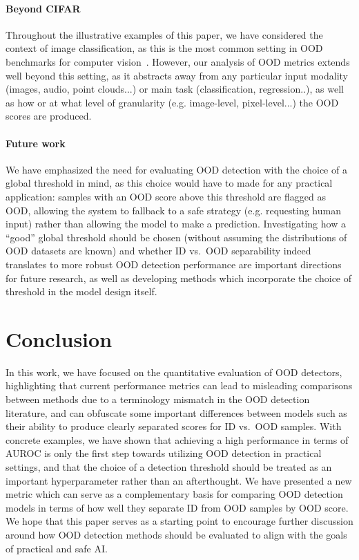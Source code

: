 \documentclass[10pt,twocolumn,letterpaper]{article}
\begin{document}
\paragraph{Beyond CIFAR} Throughout the illustrative examples of this paper, we have considered the context of image classification, as this is the most common setting in OOD benchmarks for computer vision~\cite{openood-benchmark-2022}. However, our analysis of OOD metrics extends well beyond this setting, as it abstracts away from any particular input modality (images, audio, point clouds...) or main task (classification, regression..), as well as how or at what level of granularity (e.g. image-level, pixel-level...) the OOD scores are produced.

\paragraph{Future work} We have emphasized the need for evaluating OOD detection with the choice of a global threshold in mind, as this choice would have to made for any practical application: samples with an OOD score above this threshold are flagged as OOD, allowing the system to fallback to a safe strategy (e.g. requesting human input) rather than allowing the model to make a prediction. Investigating how a ``good'' global threshold should be chosen (without assuming the distributions of OOD datasets are known) and whether ID vs.~OOD separability indeed translates to more robust OOD detection performance are important directions for future research, as well as developing methods which incorporate the choice of threshold in the model design itself.


\section{Conclusion}

In this work, we have focused on the quantitative evaluation of OOD detectors, highlighting that current performance metrics can lead to misleading comparisons between methods due to a terminology mismatch in the OOD detection literature, and can obfuscate some important differences between models such as their ability to produce clearly separated scores for ID vs.~OOD samples. With concrete examples, we have shown that achieving a high performance in terms of AUROC is only the first step towards utilizing OOD detection in practical settings, and that the choice of a detection threshold should be treated as an important hyperparameter rather than an afterthought. We have presented a new metric which can serve as a complementary basis for comparing OOD detection models in terms of how well they separate ID from OOD samples by OOD score. We hope that this paper serves as a starting point to encourage further discussion around how OOD detection methods should be evaluated to align with the goals of practical and safe AI.
\end{document}
